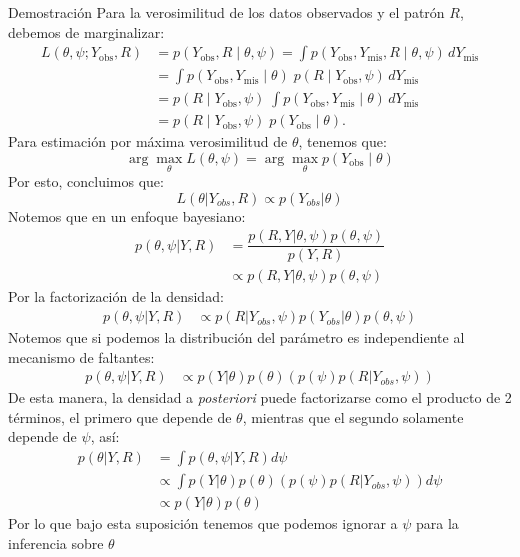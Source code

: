 \documentclass[a4paper,11pt]{article}
\begin{document}
\begin{demostracion}{Demostración}
Para la verosimilitud de los datos observados y el patrón \(R\), debemos de marginalizar:
\[
\begin{aligned}
L(\theta,\psi;Y_{\text{obs}},R)
&= p(Y_{\text{obs}},R\mid \theta,\psi)
= \int p(Y_{\text{obs}},Y_{\text{mis}},R\mid \theta,\psi)\, dY_{\text{mis}}\\
&= \int p(Y_{\text{obs}},Y_{\text{mis}}\mid\theta)\; p(R\mid Y_{\text{obs}},\psi)\, dY_{\text{mis}}\\
&= p(R\mid Y_{\text{obs}},\psi)\; \int p(Y_{\text{obs}},Y_{\text{mis}}\mid\theta)\, dY_{\text{mis}}\\
&= p(R\mid Y_{\text{obs}},\psi)\; p(Y_{\text{obs}}\mid\theta).
\end{aligned}
\]
Para estimación por máxima verosimilitud de \(\theta\), tenemos que:
\[
\arg\max_\theta L(\theta,\psi)=\arg\max_\theta p(Y_{\text{obs}}\mid\theta)
\]
Por esto, concluimos que:
\[
L(\theta|Y_{obs},R )\propto p(Y_{obs}|\theta )
\]
Notemos que en un enfoque bayesiano:
\begin{align*}
    p(\theta,\psi|Y,R )&=\dfrac{p(R,Y|\theta,\psi)p(\theta,\psi)}{p(Y,R)}\\
    &\propto p(R,Y|\theta,\psi)p(\theta,\psi)
\end{align*}
Por la factorización de la densidad:
\begin{align*}
    p(\theta,\psi|Y,R )&\propto p(R|Y_{obs},\psi  )p(Y_{obs} |\theta)p(\theta,\psi)
\end{align*}
Notemos que si podemos la distribución del parámetro es independiente al mecanismo de faltantes:
\begin{align*}
    p(\theta,\psi|Y,R )&\propto p(Y|\theta)p(\theta)\left(p(\psi) p(R|Y_{obs},\psi  )\right)
\end{align*}
De esta manera, la densidad a \textit{posteriori} puede factorizarse como el producto de 2 términos, el primero que depende de $\theta$, mientras que el segundo solamente depende de $\psi$, así:
\begin{align*}
  p(\theta| Y,R)&=\int p(\theta,\psi|Y,R)d\psi\\
  &\propto\int p(Y|\theta)p(\theta)\left(p(\psi) p(R|Y_{obs},\psi  )\right)d\psi\\
  &\propto  p(Y|\theta)p(\theta)
\end{align*}
Por lo que bajo esta suposición tenemos que podemos ignorar a  $\psi$ para la inferencia sobre $\theta$
\end{demostracion}
\end{document}

